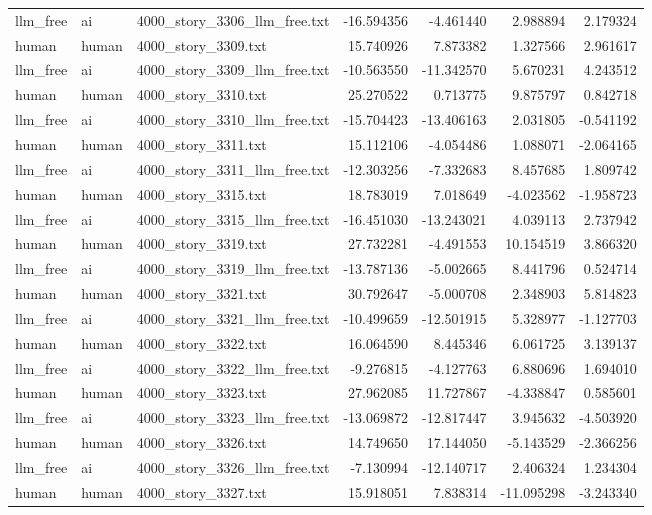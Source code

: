 \begin{longtable}{lllrrrr}
llm\_free & ai & 4000\_story\_3306\_llm\_free.txt & -16.594356 & -4.461440 & 2.988894 & 2.179324 \\
human & human & 4000\_story\_3309.txt & 15.740926 & 7.873382 & 1.327566 & 2.961617 \\
llm\_free & ai & 4000\_story\_3309\_llm\_free.txt & -10.563550 & -11.342570 & 5.670231 & 4.243512 \\
human & human & 4000\_story\_3310.txt & 25.270522 & 0.713775 & 9.875797 & 0.842718 \\
llm\_free & ai & 4000\_story\_3310\_llm\_free.txt & -15.704423 & -13.406163 & 2.031805 & -0.541192 \\
human & human & 4000\_story\_3311.txt & 15.112106 & -4.054486 & 1.088071 & -2.064165 \\
llm\_free & ai & 4000\_story\_3311\_llm\_free.txt & -12.303256 & -7.332683 & 8.457685 & 1.809742 \\
human & human & 4000\_story\_3315.txt & 18.783019 & 7.018649 & -4.023562 & -1.958723 \\
llm\_free & ai & 4000\_story\_3315\_llm\_free.txt & -16.451030 & -13.243021 & 4.039113 & 2.737942 \\
human & human & 4000\_story\_3319.txt & 27.732281 & -4.491553 & 10.154519 & 3.866320 \\
llm\_free & ai & 4000\_story\_3319\_llm\_free.txt & -13.787136 & -5.002665 & 8.441796 & 0.524714 \\
human & human & 4000\_story\_3321.txt & 30.792647 & -5.000708 & 2.348903 & 5.814823 \\
llm\_free & ai & 4000\_story\_3321\_llm\_free.txt & -10.499659 & -12.501915 & 5.328977 & -1.127703 \\
human & human & 4000\_story\_3322.txt & 16.064590 & 8.445346 & 6.061725 & 3.139137 \\
llm\_free & ai & 4000\_story\_3322\_llm\_free.txt & -9.276815 & -4.127763 & 6.880696 & 1.694010 \\
human & human & 4000\_story\_3323.txt & 27.962085 & 11.727867 & -4.338847 & 0.585601 \\
llm\_free & ai & 4000\_story\_3323\_llm\_free.txt & -13.069872 & -12.817447 & 3.945632 & -4.503920 \\
human & human & 4000\_story\_3326.txt & 14.749650 & 17.144050 & -5.143529 & -2.366256 \\
llm\_free & ai & 4000\_story\_3326\_llm\_free.txt & -7.130994 & -12.140717 & 2.406324 & 1.234304 \\
human & human & 4000\_story\_3327.txt & 15.918051 & 7.838314 & -11.095298 & -3.243340 \\

\end{longtable}
